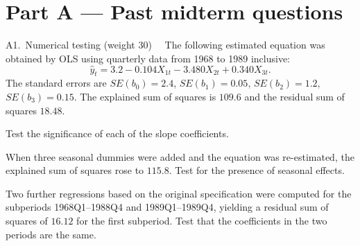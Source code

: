 \clearpage
\section{Part A --- Past midterm questions}

\begin{qbox}{A1.\ Numerical testing \quad(weight 30)}{\must\ \ }
The following estimated equation was obtained by OLS using quarterly
data from 1968 to 1989 inclusive:
\[
  \hat y_{t} = 3.2 - 0.104X_{1t} - 3.480X_{2t} + 0.340X_{3t}.
\]
The standard errors are $SE(b_{0}) = 2.4$, $SE(b_{1}) = 0.05$, $SE(b_{2}) = 1.2$,
$SE(b_{3}) = 0.15$. The explained sum of squares is $109.6$ and the residual sum
of squares $18.48$.
\begin{flatlist}
  \item[(a)] Test the significance of each of the slope coefficients.
  \item[(b)] When three seasonal dummies were added and the equation was
        re-estimated, the explained sum of squares rose to $115.8$. Test for the
        presence of seasonal effects.
  \item[(c)] Two further regressions based on the original specification were
        computed for the subperiods 1968Q1--1988Q4 and 1989Q1--1989Q4, yielding
        a residual sum of squares of $16.12$ for the first subperiod. Test that the
        coefficients in the two periods are the same.
\end{flatlist}
\end{qbox}
